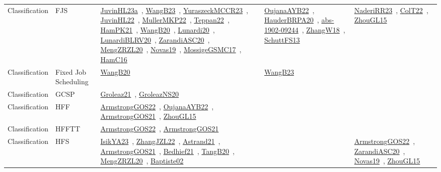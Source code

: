{\begin{longtable}{lp{3cm}>{\raggedright\arraybackslash}p{6cm}>{\raggedright\arraybackslash}p{6cm}>{\raggedright\arraybackslash}p{8cm}}
Classification & FJS & \href{../works/JuvinHL23a.pdf}{JuvinHL23a}~\cite{JuvinHL23a}, \href{../works/WangB23.pdf}{WangB23}~\cite{WangB23}, \href{../works/YuraszeckMCCR23.pdf}{YuraszeckMCCR23}~\cite{YuraszeckMCCR23}, \href{../works/JuvinHL22.pdf}{JuvinHL22}~\cite{JuvinHL22}, \href{../works/MullerMKP22.pdf}{MullerMKP22}~\cite{MullerMKP22}, \href{../works/Teppan22.pdf}{Teppan22}~\cite{Teppan22}, \href{../works/HamPK21.pdf}{HamPK21}~\cite{HamPK21}, \href{../works/WangB20.pdf}{WangB20}~\cite{WangB20}, \href{../works/Lunardi20.pdf}{Lunardi20}~\cite{Lunardi20}, \href{../works/LunardiBLRV20.pdf}{LunardiBLRV20}~\cite{LunardiBLRV20}, \href{../works/ZarandiASC20.pdf}{ZarandiASC20}~\cite{ZarandiASC20}, \href{../works/MengZRZL20.pdf}{MengZRZL20}~\cite{MengZRZL20}, \href{../works/Novas19.pdf}{Novas19}~\cite{Novas19}, \href{../works/MossigeGSMC17.pdf}{MossigeGSMC17}~\cite{MossigeGSMC17}, \href{../works/HamC16.pdf}{HamC16}~\cite{HamC16} & \href{../works/OujanaAYB22.pdf}{OujanaAYB22}~\cite{OujanaAYB22}, \href{../works/HauderBRPA20.pdf}{HauderBRPA20}~\cite{HauderBRPA20}, \href{../works/abs-1902-09244.pdf}{abs-1902-09244}~\cite{abs-1902-09244}, \href{../works/ZhangW18.pdf}{ZhangW18}~\cite{ZhangW18}, \href{../works/SchuttFS13.pdf}{SchuttFS13}~\cite{SchuttFS13} & \href{../works/NaderiRR23.pdf}{NaderiRR23}~\cite{NaderiRR23}, \href{../works/ColT22.pdf}{ColT22}~\cite{ColT22}, \href{../works/ZhouGL15.pdf}{ZhouGL15}~\cite{ZhouGL15}\\
Classification & Fixed Job Scheduling & \href{../works/WangB20.pdf}{WangB20}~\cite{WangB20} & \href{../works/WangB23.pdf}{WangB23}~\cite{WangB23} & \\
Classification & GCSP & \href{../works/Groleaz21.pdf}{Groleaz21}~\cite{Groleaz21}, \href{../works/GroleazNS20.pdf}{GroleazNS20}~\cite{GroleazNS20} &  & \\
Classification & HFF & \href{../works/ArmstrongGOS22.pdf}{ArmstrongGOS22}~\cite{ArmstrongGOS22}, \href{../works/OujanaAYB22.pdf}{OujanaAYB22}~\cite{OujanaAYB22}, \href{../works/ArmstrongGOS21.pdf}{ArmstrongGOS21}~\cite{ArmstrongGOS21}, \href{../works/ZhouGL15.pdf}{ZhouGL15}~\cite{ZhouGL15} &  & \\
Classification & HFFTT & \href{../works/ArmstrongGOS22.pdf}{ArmstrongGOS22}~\cite{ArmstrongGOS22}, \href{../works/ArmstrongGOS21.pdf}{ArmstrongGOS21}~\cite{ArmstrongGOS21} &  & \\
Classification & HFS & \href{../works/IsikYA23.pdf}{IsikYA23}~\cite{IsikYA23}, \href{../works/ZhangJZL22.pdf}{ZhangJZL22}~\cite{ZhangJZL22}, \href{../works/Astrand21.pdf}{Astrand21}~\cite{Astrand21}, \href{../works/ArmstrongGOS21.pdf}{ArmstrongGOS21}~\cite{ArmstrongGOS21}, \href{../works/Bedhief21.pdf}{Bedhief21}~\cite{Bedhief21}, \href{../works/TangB20.pdf}{TangB20}~\cite{TangB20}, \href{../works/MengZRZL20.pdf}{MengZRZL20}~\cite{MengZRZL20}, \href{../works/Baptiste02.pdf}{Baptiste02}~\cite{Baptiste02} &  & \href{../works/ArmstrongGOS22.pdf}{ArmstrongGOS22}~\cite{ArmstrongGOS22}, \href{../works/ZarandiASC20.pdf}{ZarandiASC20}~\cite{ZarandiASC20}, \href{../works/Novas19.pdf}{Novas19}~\cite{Novas19}, \href{../works/ZhouGL15.pdf}{ZhouGL15}~\cite{ZhouGL15}\\

\end{longtable}}

